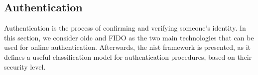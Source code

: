 \subsection{Authentication} \label{authentication_sota}
Authentication is the process of confirming and verifying someone's identity. In this section, we consider \acrlong{oidc} and FIDO as the two main technologies that can be used for online authentication. Afterwards, the \acrshort{nist} framework is presented, as it defines a useful classification model for authentication procedures, based on their security level.



